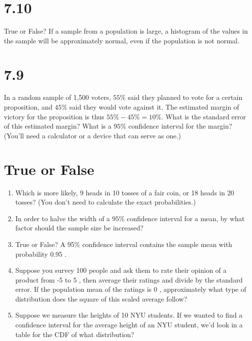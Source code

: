 \documentclass{article}%
\begin{document}
\section{7.10}
 True or False? If a sample from a population is large, a histogram of the values in the sample will be approximately normal, even if the population is not normal.



\section{7.9} In a random sample of 1,500 voters, $55 \%$ said they planned to vote for a certain proposition, and $45 \%$ said they would vote against it. The estimated margin of victory for the proposition is thus $55 \%-45 \%=10 \%$. What is the standard error of this estimated margin? What is a $95 \%$ confidence interval for the margin? (You'll need a calculator or a device that can serve as one.)

\section{True or False}

\begin{enumerate}
    \item Which is more likely, 9 heads in 10 tosses of a fair coin, or 18 heads in 20 tosses? (You don't need to calculate the exact probabilities.)
    \item In order to halve the width of a $95 \%$ confidence interval for a mean, by what factor should the sample size be increased?
    \item True or False? A 95\% confidence interval contains the sample mean with probability 0.95 .
    \item Suppose you survey 100 people and ask them to rate their opinion of a product from -5 to 5 , then average their ratings and divide by the standard error. If the population mean of the ratings is 0 , approximately what type of distribution does the square of this scaled average follow?
    \item Suppose we measure the heights of 10 NYU students. If we wanted to find a confidence interval for the average height of an NYU student, we'd look in a table for the CDF of what distribution?
\end{enumerate}


%
%
\end{document}
